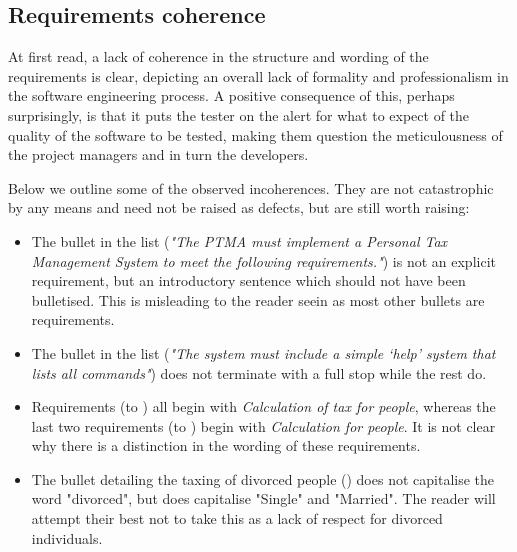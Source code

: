 \subsection{Requirements coherence}
At first read, a lack of coherence in the structure and wording of the requirements is clear, depicting an overall lack of formality and professionalism in the software engineering process. 
A positive consequence of this, perhaps surprisingly, is that it puts the tester on the alert for what to expect of the quality of the software to be tested, making them question the meticulousness of the project managers and in turn the developers.
\par
Below we outline some of the observed incoherences. They are not catastrophic by any means and need not be raised as defects, but are still worth raising:
\begin{itemize}
    \item The  bullet in the list (\textit{"The PTMA must implement a Personal Tax Management System to meet the following requirements."}) is not an explicit requirement, but an introductory sentence which should not have been bulletised. This is misleading to the reader seein as most other bullets are requirements. 
	\item The  bullet in the list (\textit{"The system must include a simple ‘help’ system that lists all commands"}) does not terminate with a full stop while the rest do. 
	\item Requirements (\REightFive to \REightTen) all begin with \textit{Calculation of tax for people}, whereas the last two requirements (\REightEleven to \REightTwelve) begin with \textit{Calculation for people}. It is not clear why there is a distinction in the wording of these requirements. 
	\item The bullet detailing the taxing of divorced people (\REightSeven) does not capitalise the word "divorced", but does capitalise "Single" and "Married". The reader will attempt their best not to take this as a lack of respect for divorced individuals. 
\end{itemize}

